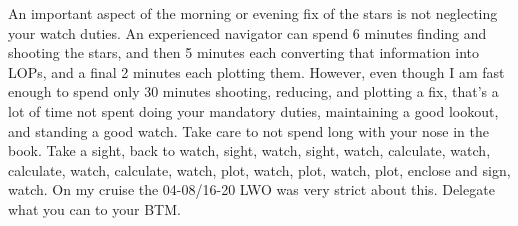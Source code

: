 \documentclass[letterpaper,12pt]{article}
\begin{document}
An important aspect of the morning or evening fix of the stars is not neglecting your watch duties.
An experienced navigator can spend 6 minutes finding and shooting the stars, and then 5 minutes each converting that information into LOPs, and a final 2 minutes each plotting them. 
However, even though I am fast enough to spend only 30 minutes shooting, reducing, and plotting a fix, that's a lot of time not spent doing your mandatory duties, maintaining a good lookout, and standing a good watch.
Take care to not spend long with your nose in the book.
Take a sight, back to watch, sight, watch, sight, watch, calculate, watch, calculate, watch, calculate, watch, plot, watch, plot, watch, plot, enclose and sign, watch.
On my cruise the 04-08/16-20 LWO was very strict about this.
Delegate what you can to your BTM.
\clearpage
\printbibliography
\end{document}
